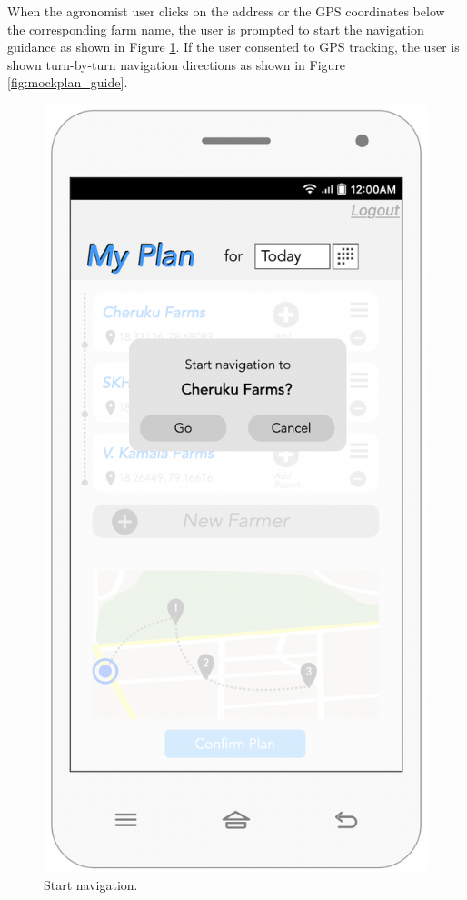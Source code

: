 \newpage
\begin{flushleft}
When the agronomist user clicks on the address or the GPS coordinates below the corresponding farm name, the user is prompted to start the navigation guidance as shown in Figure \ref{fig:mockplan_nav}. If the user consented to GPS tracking, the user is shown turn-by-turn navigation directions as shown in Figure \ref{fig:mockplan_guide}.
\end{flushleft}

\begin{multicols}{2}
\begin{figure}[H]
\centering
\includegraphics[scale=0.5]{../images_diagrams/mock_ups/dd/Plan03_StartNav.png}
\caption{\label{fig:mockplan_nav}Start navigation.}
\end{figure}


\end{multicols}
